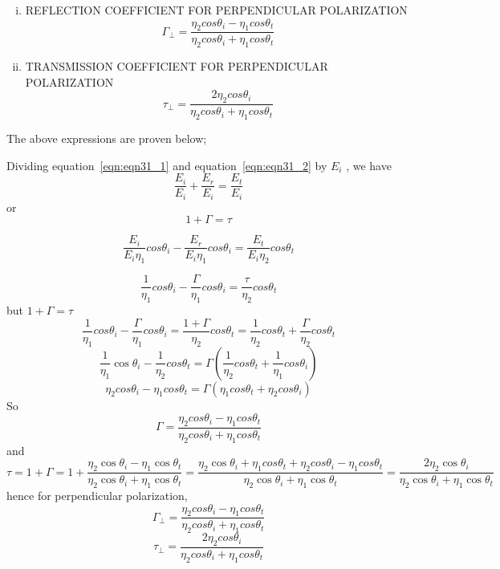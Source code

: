\begin{enumerate}[(i)]
\item REFLECTION COEFFICIENT FOR PERPENDICULAR POLARIZATION
$$\Gamma_{\bot} = \frac{\eta_{2} cos\theta_{i} - \eta_{1} cos\theta_{t}}{\eta_{2} cos\theta_{i} + \eta_{1} cos\theta_{t}}$$
\item TRANSMISSION COEFFICIENT FOR PERPENDICULAR POLARIZATION
$$\tau_{\bot} = \frac{2 \eta_{2} cos\theta_{i}}{\eta_{2} cos\theta_{i} + \eta_{1} cos\theta_{t}}$$
\end{enumerate}
The above expressions are proven below;

Dividing equation~\ref{eqn:eqn31_1} and equation~\ref{eqn:eqn31_2} by $E_{i}$ , we have
\begin{equation*}
\frac{E_{i}}{E_{i}} + \frac{E_{r}}{E_{i}} = \frac{E_{t}}{E_{i}}
\end{equation*}
or
\begin{equation*}
1 + \Gamma = \tau
\end{equation*}

\begin{equation*}
\frac{E_{i}}{E_{i}\eta_{1}}cos\theta_{i} - \frac{E_{r}}{E_{i}\eta_{1}}cos\theta_{i} = \frac{E_{t}}{E_{i}\eta_{2}}cos\theta_{t}
\end{equation*}

\begin{equation*}
\frac{1}{\eta_{1}}cos\theta_{i} - \frac{\Gamma}{\eta_{1}}cos\theta_{i} = \frac{\tau}{\eta_{2}}cos\theta_{t}
\end{equation*}
but $1 + \Gamma = \tau$
\begin{dmath*}
\frac{1}{\eta_{1}}cos\theta_{i} - \frac{\Gamma}{\eta_{1}}cos\theta_{i} = \frac{1+\Gamma}{\eta_{2}}cos\theta_{t} = \frac{1}{\eta_{2}}cos\theta_{t} + \frac{\Gamma}{\eta_{2}}cos\theta_{t}
\end{dmath*}
\begin{equation*}
\frac{1}{\eta_{1}}\cos\theta_{i} - \frac{1}{\eta_{2}}cos\theta_{t} 	= \Gamma( \frac{1}{\eta_{2}}cos\theta_{t} + \frac{1}{\eta_{1}}cos\theta_{i})
\end{equation*}
$$\eta_{2}cos\theta_{i} - \eta_{1}cos\theta_{t} = \Gamma(\eta_{1}cos\theta_{t} + \eta_{2}cos\theta_{i})$$
So
$$\Gamma = \frac{\eta_{2}cos\theta_{i} - \eta_{1}cos\theta_{t}}{\eta_{2}cos\theta_{i} + \eta_{1}cos\theta_{t}}$$
and
\begin{dmath*}
\tau = 1 + \Gamma = 1 + \frac{\eta_{2}\cos\theta_{i} - \eta_{1}\cos\theta_{t}}{\eta_{2}\cos\theta_{i} + \eta_{1}\cos\theta_{t}}
= \frac{\eta_{2}\cos\theta_{i} + \eta_{1}cos\theta_{t} + \eta_{2}cos\theta_{i} - \eta_{1}cos\theta_{t}}{\eta_{2}\cos\theta_{i} + \eta_{1}\cos\theta_{t}} = \frac{2 \eta_{2}\cos\theta_{i}}{\eta_{2}\cos\theta_{i} + \eta_{1}\cos\theta_{t}}
\end{dmath*}
hence for perpendicular polarization,
\begin{dmath}
\Gamma_{\perp} = \frac{\eta_{2}cos\theta_{i} - \eta_{1}cos\theta_{t}}{\eta_{2}cos\theta_{i} + \eta_{1}cos\theta_{t}}
\label{eqn:eqn31_3}
\end{dmath}
\begin{dmath}
\tau_{\perp} = \frac{2 \eta_{2}cos\theta_{i}}{\eta_{2}cos\theta_{i} + \eta_{1}cos\theta_{t}}
\label{eqn:eqn31_4}
\end{dmath}



